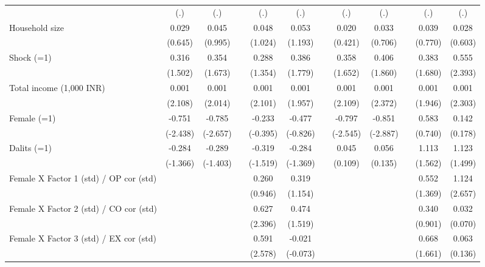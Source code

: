 {\begin{longtable}{@{\extracolsep{\fill}}lccccccccccc}
          & (.)   & (.)   &       & (.)   & (.)   &       & (.)   & (.)   &       & (.)   & (.) \\
    Household size & 0.029 & 0.045 &       & 0.048 & 0.053 &       & 0.020 & 0.033 &       & 0.039 & 0.028 \\
          & (0.645) & (0.995) &       & (1.024) & (1.193) &       & (0.421) & (0.706) &       & (0.770) & (0.603) \\
    Shock (=1) & 0.316 & 0.354 &       & 0.288 & 0.386 &       & 0.358 & 0.406 &       & 0.383 & 0.555 \\
          & (1.502) & (1.673) &       & (1.354) & (1.779) &       & (1.652) & (1.860) &       & (1.680) & (2.393) \\
    Total income (1,000 INR) & 0.001 & 0.001 &       & 0.001 & 0.001 &       & 0.001 & 0.001 &       & 0.001 & 0.001 \\
          & (2.108) & (2.014) &       & (2.101) & (1.957) &       & (2.109) & (2.372) &       & (1.946) & (2.303) \\
    Female (=1) & -0.751 & -0.785 &       & -0.233 & -0.477 &       & -0.797 & -0.851 &       & 0.583 & 0.142 \\
          & (-2.438) & (-2.657) &       & (-0.395) & (-0.826) &       & (-2.545) & (-2.887) &       & (0.740) & (0.178) \\
    Dalits (=1) & -0.284 & -0.289 &       & -0.319 & -0.284 &       & 0.045 & 0.056 &       & 1.113 & 1.123 \\
          & (-1.366) & (-1.403) &       & (-1.519) & (-1.369) &       & (0.109) & (0.135) &       & (1.562) & (1.499) \\
    Female X Factor 1 (std) / OP cor (std) &       &       &       & 0.260 & 0.319 &       &       &       &       & 0.552 & 1.124 \\
          &       &       &       & (0.946) & (1.154) &       &       &       &       & (1.369) & (2.657) \\
    Female X Factor 2 (std) / CO cor (std) &       &       &       & 0.627 & 0.474 &       &       &       &       & 0.340 & 0.032 \\
          &       &       &       & (2.396) & (1.519) &       &       &       &       & (0.901) & (0.070) \\
    Female X Factor 3 (std) / EX cor (std) &       &       &       & 0.591 & -0.021 &       &       &       &       & 0.668 & 0.063 \\
          &       &       &       & (2.578) & (-0.073) &       &       &       &       & (1.661) & (0.136) \\

\end{longtable}}
